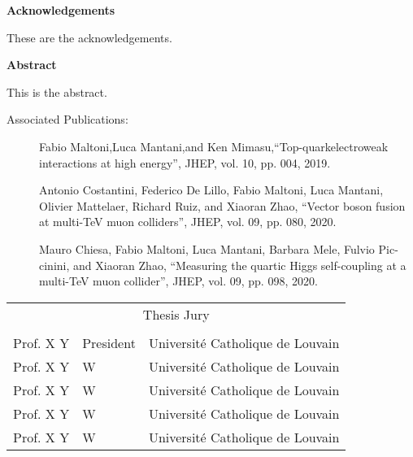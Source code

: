 
\hfill
\newenvironment{acknowledgements}%
    {\cleardoublepage\thispagestyle{empty}\null\vfill\begin{center}%
    \bfseries Acknowledgements\end{center}}%
    {\vfill\null}
        \begin{acknowledgements}
        These are the acknowledgements.
        \end{acknowledgements}


\hfill
\newenvironment{Abstract}%
    {\cleardoublepage\thispagestyle{empty}\null\vfill\begin{center}%
    \bfseries Abstract\end{center}}%
    {\vfill\null}
        \begin{Abstract}
        This is the abstract.
        \end{Abstract}

\clearpage

\begin{center}

\vspace{121pt}

{\LARGE Associated Publications:}
\vspace{22pt}
\begin{description}
\item[\cite{Maltoni:2019aot}] 
Fabio Maltoni,Luca Mantani,and Ken Mimasu,“Top-quarkelectroweak interactions at high energy”, JHEP, vol. 10, pp. 004, 2019.
\item[\cite{Costantini:2020stv}]
Antonio Costantini, Federico De Lillo, Fabio Maltoni, Luca Mantani, Olivier Mattelaer, Richard Ruiz, and Xiaoran Zhao, “Vector boson fusion at multi-TeV muon colliders”, JHEP, vol. 09, pp. 080, 2020.
\item[\cite{Chiesa:2020awd}]
Mauro Chiesa, Fabio Maltoni, Luca Mantani, Barbara Mele, Fulvio Pic- cinini, and Xiaoran Zhao, “Measuring the quartic Higgs self-coupling at a multi-TeV muon collider”, JHEP, vol. 09, pp. 098, 2020.
\end{description}

\vfill
\begin{tabular}{llc} 
\multicolumn{3}{c}{\large Thesis Jury}                                  \\
                    &               &                           \\
\toprule 
Prof. X Y       & President     & Université Catholique de Louvain  \\
Prof. X Y       & W    & Université Catholique de Louvain  \\
Prof. X Y       & W    & Université Catholique de Louvain  \\
Prof. X Y       & W    & Université Catholique de Louvain  \\
Prof. X Y       & W    & Université Catholique de Louvain  \\
\bottomrule
\end{tabular}

\vspace{44pt}

\end{center}

\pagestyle{empty}
\tableofcontents
